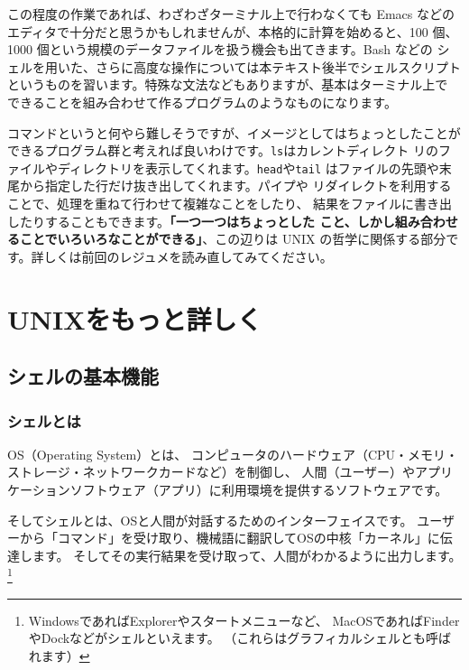\documentclass[a4j]{ltjreport}
\begin{document}
    この程度の作業であれば、わざわざターミナル上で行わなくても Emacs などの
    エディタで十分だと思うかもしれませんが、本格的に計算を始めると、100 個、
    1000 個という規模のデータファイルを扱う機会も出てきます。Bash などの
    シェルを用いた、さらに高度な操作については本テキスト後半でシェルスクリプト
    というものを習います。特殊な文法などもありますが、基本はターミナル上で
    できることを組み合わせて作るプログラムのようなものになります。

    \vspace*{3mm}

    コマンドというと何やら難しそうですが、イメージとしてはちょっとしたことが
    できるプログラム群と考えれば良いわけです。\verb+ls+はカレントディレクト
    リのファイルやディレクトリを表示してくれます。\verb+head+や\verb+tail+
    はファイルの先頭や末尾から指定した行だけ抜き出してくれます。パイプや
    リダイレクトを利用することで、処理を重ねて行わせて複雑なことをしたり、
    結果をファイルに書き出したりすることもできます。\textbf{「一つ一つはちょっとした
    こと、しかし組み合わせることでいろいろなことができる」}、この辺りは UNIX
    の哲学に関係する部分です。詳しくは前回のレジュメを読み直してみてください。





    \chapter{UNIXをもっと詳しく}
    \section{シェルの基本機能}
    \subsection{シェルとは}
    OS（Operating System）とは、
    コンピュータのハードウェア（CPU・メモリ・ストレージ・ネットワークカードなど）を制御し、
    人間（ユーザー）やアプリケーションソフトウェア（アプリ）に利用環境を提供するソフトウェアです。

    そしてシェルとは、OSと人間が対話するためのインターフェイスです。
    ユーザーから「コマンド」を受け取り、機械語に翻訳してOSの中核「カーネル」に伝達します。
    そしてその実行結果を受け取って、人間がわかるように出力します。
    \footnote{WindowsであればExplorerやスタートメニューなど、
    MacOSであればFinderやDockなどがシェルといえます。
    （これらはグラフィカルシェルとも呼ばれます）}
\end{document}
